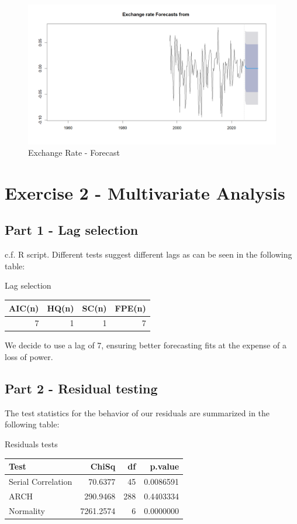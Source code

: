 \documentclass[
]{article}
\begin{document}
\begin{figure}

{\centering \includegraphics[width=0.8\linewidth]{../results/Exchange Rate_forecast} 

}

\caption{Exchange Rate - Forecast}\label{fig:unnamed-chunk-20}
\end{figure}

\section*{Exercise 2 - Multivariate Analysis}

\subsection*{Part 1 - Lag selection}

c.f. R script. Different tests suggest different lags as can be seen in
the following table:

\bgroup \table[H]
\centering
\caption{\label{tab:unnamed-chunk-21}Lag selection}
\centering
\begin{tabular}[t]{rrrr}
\toprule
AIC(n) & HQ(n) & SC(n) & FPE(n)\\
\midrule
7 & 1 & 1 & 7\\
\bottomrule
\end{tabular}
\endtable\egroup

We decide to use a lag of 7, ensuring better forecasting fits at the
expense of a loss of power.

\subsection*{Part 2 - Residual testing}

The test statistics for the behavior of our residuals are summarized in
the following table:

\bgroup \table[H]
\centering
\caption{\label{tab:unnamed-chunk-22}Residuals tests}
\centering
\begin{tabular}[t]{lrrr}
\toprule
Test & ChiSq & df & p.value\\
\midrule
Serial Correlation & 70.6377 & 45 & 0.0086591\\
ARCH & 290.9468 & 288 & 0.4403334\\
Normality & 7261.2574 & 6 & 0.0000000\\
\bottomrule
\end{tabular}
\endtable\egroup
\end{document}
